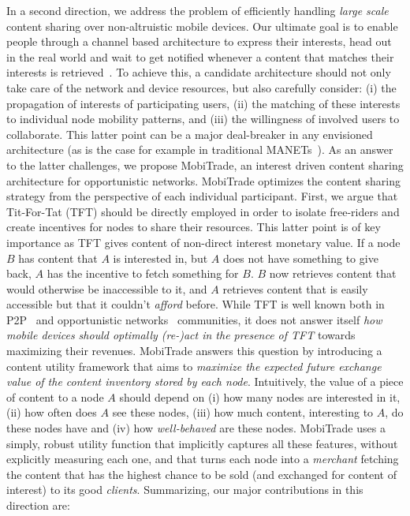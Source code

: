 In a second direction, we address the problem of efficiently handling \emph{large scale} content sharing over non-altruistic mobile devices. Our ultimate goal is to enable people through a channel based architecture to express their interests, head out in the real world and wait to get notified whenever a content that matches their interests is retrieved~\cite{CCN, MobiCent, IADTN, MoB, OptimalChannelChoice, ContentPlace, SocialCast2, SocialCast, BlueTorrent, TACODTN, Peoplenet}. To achieve this, a candidate architecture should not only take care of the network and device resources, but also carefully consider: (i) the propagation of interests of participating users, (ii) the matching of these interests to individual node mobility patterns, and (iii) the willingness of involved users to collaborate. This latter point can be a major deal-breaker in any envisioned architecture (as is the case for example in traditional MANETs~\cite{NashEquilibria}). As an answer to the latter challenges, we propose MobiTrade, an interest driven content sharing architecture for opportunistic networks. MobiTrade optimizes the content sharing strategy from the perspective of each individual participant. First, we argue that Tit-For-Tat (TFT) should be directly employed in order to isolate free-riders and create incentives for nodes to share their resources. This latter point is of key importance as TFT gives content of non-direct interest monetary value. If a node $B$ has content that $A$ is interested in, but $A$ does not have something to give back, $A$ has the incentive to fetch something for $B$. $B$ now retrieves content that would otherwise be inaccessible to it, and $A$ retrieves content that is easily accessible but that it couldn't \emph{afford} before. While TFT is well known both in P2P~\cite{BitHoc} and opportunistic networks~\cite{BarterDTN} communities, it does not answer itself \emph{how mobile devices should optimally (re-)act in the presence of TFT} towards maximizing their revenues. MobiTrade answers this question by introducing a content utility framework that aims to \emph{maximize the expected future exchange value of the content inventory stored by each node}. Intuitively, the value of a piece of content to a node $A$ should depend on (i) how many nodes are interested in it, (ii) how often does $A$ see these nodes, (iii) how much content, interesting to $A$, do these nodes have and (iv) how \emph{well-behaved} are these nodes. MobiTrade uses a simply, robust utility function that implicitly captures all these features, without explicitly measuring each one, and that turns each node into a \emph{merchant} fetching the content that has the highest chance to be sold (and exchanged for content of interest) to its good \emph{clients}. Summarizing, our major contributions in this direction are:
